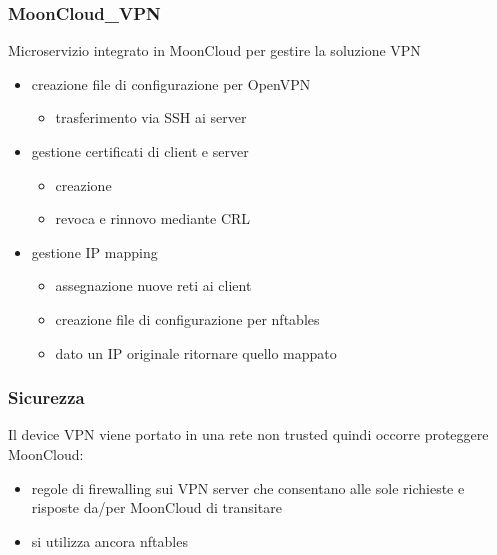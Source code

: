 \begin{frame}
    \frametitle{MoonCloud\_VPN}
    \alert{Microservizio} integrato in MoonCloud per gestire la soluzione VPN
    \begin{itemize}
        \item creazione file di \alert{configurazione} per \alert{OpenVPN}
        \begin{itemize}
            \item \alert{trasferimento} via SSH ai server
        \end{itemize}
        \item gestione \alert{certificati} di client e server
        \begin{itemize}
            \item creazione
            \item revoca e rinnovo mediante \alert{CRL}
        \end{itemize}
        \item gestione \alert{IP mapping}
        \begin{itemize}
            \item assegnazione nuove reti ai client
            \item creazione file di \alert{configurazione} per \alert{nftables}
            \item dato un IP originale ritornare quello mappato
        \end{itemize}
    \end{itemize}
\end{frame}

\begin{frame}
    \frametitle{Sicurezza}
    Il device VPN viene portato in una rete \alert{non trusted} quindi
    occorre \alert{proteggere MoonCloud}:
    \begin{itemize}
        \item \alert{regole di firewalling} sui VPN server che consentano
        alle \alert{sole richieste e risposte} da/per MoonCloud di transitare
    \end{itemize}

    \begin{itemize}
        \item si utilizza ancora \alert{nftables}
    \end{itemize}
\end{frame}

